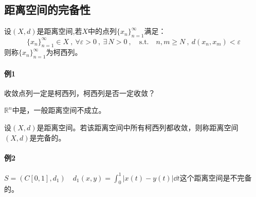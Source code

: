 \subsection{距离空间的完备性}\label{complete}
\begin{definition}[柯西列]
    设$(X,d)$是距离空间,若$X$中的点列$\{x_n\}_{n=1}^{\infty}$满足：
    \[\{x_n\}_{n=1}^{\infty} \in X \ , \ \forall \varepsilon>0 \ , \ \exists \, N>0 \ , \quad \text{s.t.} \quad n,m \geq N \ , \ d(x_n,x_m)<\varepsilon\]
    则称$\{x_n\}_{n=1}^{\infty}$为柯西列。
\end{definition}

\paragraph*{例1} \quad 收敛点列一定是柯西列，柯西列是否一定收敛？

$\mathbb{R}^n$中是，一般距离空间不成立。
\begin{definition}[完备距离空间]
    设$(X,d)$是距离空间。若该距离空间中所有柯西列都收敛，则称距离空间$(X,d)$是完备的。
\end{definition}

\paragraph*{例2} \quad $S=(C[0,1],d_1) \quad d_1(x,y)=\int_0^1|x(t)-y(t)|\dd t$这个距离空间是不完备的。

